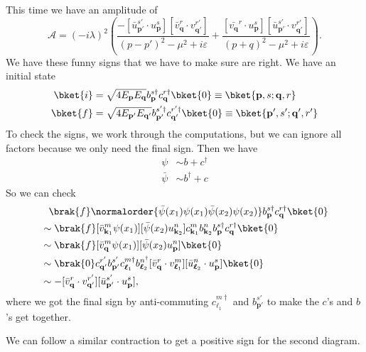 \documentclass[a4paper]{article}
\begin{document}
\begin{eg}
\begin{center}
  \end{center}
  This time we have an amplitude of
  \[
    \mathcal{A} = (-i\lambda)^2 \left(\frac{-[\bar u_{\mathbf{p}'}^{s'} \cdot u_\mathbf{p}^s][\bar v_\mathbf{q}^r \cdot v_{\mathbf{q}'}^{r'}]}{(p - p')^2 - \mu^2 + i \varepsilon} + \frac{[\bar{v_\mathbf{q}}^r \cdot u_\mathbf{p}^s][\bar u_{\mathbf{p}'}^{s'} \cdot v_{\mathbf{q}'}^{r'}]}{(p + q)^2 - \mu^2 + i \varepsilon}\right).
  \]
  We have these funny signs that we have to make sure are right. We have an initial state
  \begin{align*}
    \bket{i} &= \sqrt{4 E_\mathbf{p} E_\mathbf{q}} b_\mathbf{p}^{s\dagger}c_\mathbf{q}^{r\dagger}\bket{0} \equiv \bket{\mathbf{p}, s; \mathbf{q}, r}\\
    \bket{f} &= \sqrt{4E_{\mathbf{p}'} E_{\mathbf{q}'}} b_{\mathbf{p}'} ^{s'\dagger} c_{\mathbf{q}'}^{r'\dagger} \bket{0} \equiv \bket{\mathbf{p}', s'; \mathbf{q}', r'}
  \end{align*}
  To check the signs, we work through the computations, but we can ignore all factors because we only need the final sign. Then we have
  \begin{align*}
    \psi &\sim b + c^\dagger\\
    \bar\psi &\sim b^\dagger + c
  \end{align*}
  So we can check
  \begin{align*}
    &\hphantom{=} \brak{f} \normalorder{\bar\psi(x_1) \psi(x_1) \bar\psi(x_2) \psi(x_2)} b_\mathbf{p}^{s\dagger} c_{\mathbf{q}}^{r\dagger}\bket{0}\\
    &\sim \brak{f} [\bar{v}_{\mathbf{k}_1}^m \psi(x_1)][\bar\psi(x_2) u_{\mathbf{k}_2}^n] c_{\mathbf{k}_1}^m b_{\mathbf{k}_2}^n b_{\mathbf{p}}^{s\dagger} c_{\mathbf{q}}^{r\dagger}\bket{0}\\
    &\sim \brak{f}[\bar{v}_{\mathbf{q}}^m \psi(x_1)][\bar\psi(x_2) u_{\mathbf{p}}^n]\bket{0}\\
    &\sim \brak{0}c_{\mathbf{q}'}^{r'} b_{\mathbf{p}'}^{s'} c_{\boldsymbol\ell_1}^{m\dagger} b_{\boldsymbol\ell_2}^{n^\dagger} [\bar{v}_{\mathbf{q}}^r \cdot v_{\boldsymbol{\ell}_1}^m][\bar{u}_{\boldsymbol{\ell}_2}^n \cdot u_\mathbf{p}^s ]\bket{0}\\
    &\sim -[\bar{v}_\mathbf{q}^r \cdot v_{\mathbf{q}'}^{r'}][\bar{u}_{\mathbf{p}'}^{s'} \cdot u_\mathbf{p}^s],
  \end{align*}
  where we got the final sign by anti-commuting $c_{\mathbf{\ell}_1}^{m\dagger}$ and $b_{\mathbf{p}'}^{s'}$ to make the $c$'s and $b$'s get together.

  We can follow a similar contraction to get a positive sign for the second diagram.
\end{eg}
\end{document}
